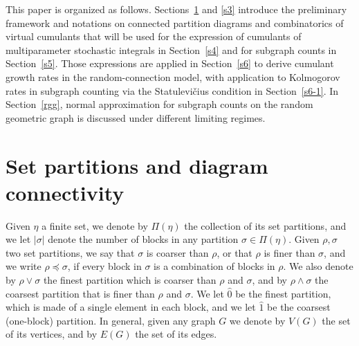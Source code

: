 \documentclass[12pt]{article}
\numberwithin{equation}{section}
\begin{document}
 This paper is organized as follows.
 Sections~\ref{s2} and \ref{s3} introduce the preliminary
 framework and notations on connected partition diagrams
 and combinatorics of virtual cumulants that will be used for 
 the expression of cumulants of multiparameter stochastic integrals
 in Section~\ref{s4} and for subgraph counts in Section~\ref{s5}. 
 Those expressions are applied in Section~\ref{s6}
 to derive cumulant growth rates in the random-connection model, with application to Kolmogorov rates in subgraph counting via the {Statulevi\v{c}ius condition} in Section~\ref{s6-1}.
 In Section~\ref{rgg}, normal approximation for subgraph counts on the random geometric graph is discussed under different limiting regimes. 

\section{Set partitions and diagram connectivity} %
\label{s2}
\noindent
Given $\eta$ a finite set, we denote by $\Pi ( \eta )$ the collection
of its set partitions, and we let $|\sigma|$ denote the number of blocks in any partition $\sigma \in \Pi ( \eta )$. 
Given $\rho,\sigma$ two set partitions, we say that $\sigma$ is coarser than $\rho$,
or that $\rho$ is finer than $\sigma$,
and we write $\rho\preceq\sigma$,
if every block in $\sigma$ is a combination of blocks in $\rho$. 
We also denote by $\rho\vee\sigma$ the finest partition which is coarser than $\rho$ and $\sigma$, and by $\rho\wedge\sigma$ the coarsest partition that is finer than $\rho$ and $\sigma$.
We let $\widehat{0}$ be the finest partition, which is made of a single element in each block, and we let $\widehat{1}$ be the coarsest (one-block) partition. 
In general, given any graph $G$ we denote by $V(G)$ the set of its vertices, and by $E(G)$ the set of its edges.

\medskip
 
\end{document}
